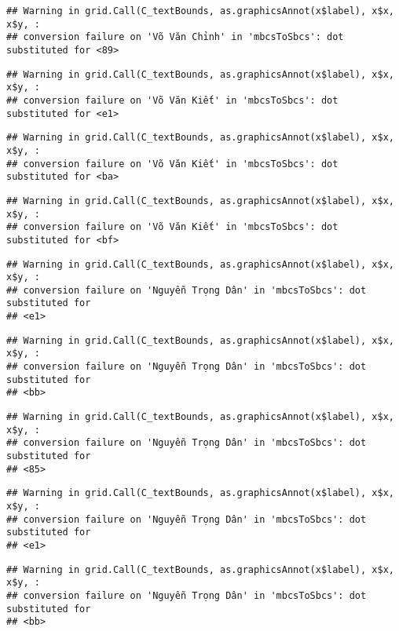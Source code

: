 \documentclass[
]{article}
\begin{document}
\begin{verbatim}
## Warning in grid.Call(C_textBounds, as.graphicsAnnot(x$label), x$x, x$y, :
## conversion failure on 'Võ Văn Chỉnh' in 'mbcsToSbcs': dot substituted for <89>
\end{verbatim}

\begin{verbatim}
## Warning in grid.Call(C_textBounds, as.graphicsAnnot(x$label), x$x, x$y, :
## conversion failure on 'Võ Văn Kiết' in 'mbcsToSbcs': dot substituted for <e1>
\end{verbatim}

\begin{verbatim}
## Warning in grid.Call(C_textBounds, as.graphicsAnnot(x$label), x$x, x$y, :
## conversion failure on 'Võ Văn Kiết' in 'mbcsToSbcs': dot substituted for <ba>
\end{verbatim}

\begin{verbatim}
## Warning in grid.Call(C_textBounds, as.graphicsAnnot(x$label), x$x, x$y, :
## conversion failure on 'Võ Văn Kiết' in 'mbcsToSbcs': dot substituted for <bf>
\end{verbatim}

\begin{verbatim}
## Warning in grid.Call(C_textBounds, as.graphicsAnnot(x$label), x$x, x$y, :
## conversion failure on 'Nguyễn Trọng Dân' in 'mbcsToSbcs': dot substituted for
## <e1>
\end{verbatim}

\begin{verbatim}
## Warning in grid.Call(C_textBounds, as.graphicsAnnot(x$label), x$x, x$y, :
## conversion failure on 'Nguyễn Trọng Dân' in 'mbcsToSbcs': dot substituted for
## <bb>
\end{verbatim}

\begin{verbatim}
## Warning in grid.Call(C_textBounds, as.graphicsAnnot(x$label), x$x, x$y, :
## conversion failure on 'Nguyễn Trọng Dân' in 'mbcsToSbcs': dot substituted for
## <85>
\end{verbatim}

\begin{verbatim}
## Warning in grid.Call(C_textBounds, as.graphicsAnnot(x$label), x$x, x$y, :
## conversion failure on 'Nguyễn Trọng Dân' in 'mbcsToSbcs': dot substituted for
## <e1>
\end{verbatim}

\begin{verbatim}
## Warning in grid.Call(C_textBounds, as.graphicsAnnot(x$label), x$x, x$y, :
## conversion failure on 'Nguyễn Trọng Dân' in 'mbcsToSbcs': dot substituted for
## <bb>
\end{verbatim}
\end{document}
